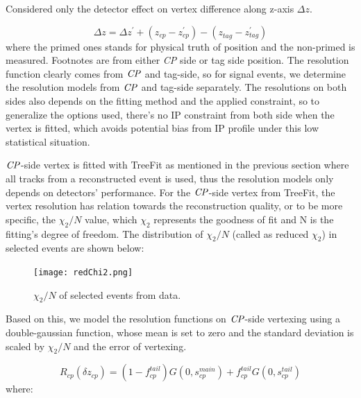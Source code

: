 Considered only the detector effect on vertex difference along z-axis $\Delta z$. 

\begin{equation}
\Delta z 
=\Delta z^{'} + (z_{cp}^{}- z_{cp}^{'}) - (z_{tag}^{}- z_{tag}^{'}) 
\end{equation}where the primed ones stands for physical truth of position and the non-primed is measured. Footnotes are from either \textit{CP} side or tag side position. The resolution function clearly comes from $\it{CP}$ and tag-side, so for signal events, we determine the resolution models from $\it{CP}$ and tag-side separately. The resolutions on both sides also depends on the fitting method and the applied constraint, so to generalize the options used, there's no IP constraint from both side when the vertex is fitted, which avoids potential bias from  IP profile under this low statistical situation.

$\it{CP}$-side vertex is fitted with TreeFit as mentioned in the previous section where all tracks from a reconstructed event is used, thus the resolution models only depends on detectors' performance. For the $\it{CP}$-side vertex from TreeFit, the vertex resolution has relation towards the reconstruction quality, or to be more specific, the $\chi_2/N$ value, which $\chi_2$ represents the goodness of fit and N is the fitting's degree of freedom. The distribution of $\chi_2/N$ (called as reduced $\chi_2$) in selected events are shown below: 

\begin{figure}[H]
	\centering
	\texttt{[image: redChi2.png]}
	\caption{$\chi_2/N$ of selected events from data.}
\end{figure}

Based on this, we model the resolution functions on $\it{CP}$-side vertexing using a double-gaussian function, whose mean is set to zero and the standard deviation is scaled by $\chi_2/N$ and the error of vertexing. 

\begin{equation}
R_{cp}(\delta z_{cp}) = (1-f_{cp}^{tail})G(0,s_{cp}^{main})+
f_{cp}^{tail}G(0,s_{cp}^{tail})
\end{equation} where: 

